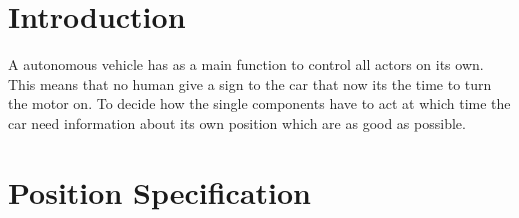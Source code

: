 \section{Introduction}\label{sec:positioningIntroduction}
A autonomous vehicle has as a main function to control all actors on its own.
This means that no human give a sign to the car that now its the time to turn the motor on.
To decide how the single components have to act at which time the car need information about its own position which are as good as possible.


\section{Position Specification}